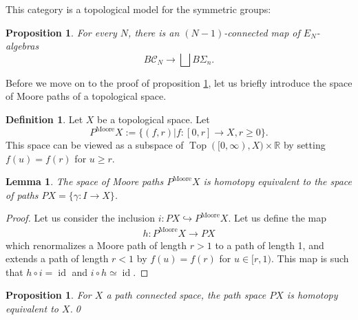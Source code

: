 \documentclass[12pt]{amsart}
\theoremstyle{plain}
\newtheorem{prop}[teo]{Proposition}
\newtheorem{lem}[teo]{Lemma}
\theoremstyle{definition}
\newtheorem{defi}[teo]{Definition}
\theoremstyle{remark}
\DeclareMathOperator{\id}{id}
\DeclareMathOperator{\Top}{Top}
\DeclareMathOperator{\Moore}{Moore}
\newcommand{\C}{\mathcal{C}}
\begin{document}
This category is a topological model for the symmetric groups: 
\begin{prop}\label{homeq}
    For every $N$, there is an $(N-1)$-connected map of $E_N$-algebras
    \[B\C_N\rightarrow\bigsqcup B\Sigma_n.\]
\end{prop}

Before we move on to the proof of proposition \ref{homeq}, let us briefly introduce the space of Moore paths of a topological space.
\begin{defi}
Let $X$ be a topological space. Let \[P^{\Moore}X := \{(f,r)\vert f:[0,r]\rightarrow X, r\geq 0\}.\] 
This space can be viewed as a subspace of $\Top([0,\infty),X)\times\mathbb{R}$ by setting $f(u) = f(r)$ for $u\geq r$.
\end{defi}
\begin{lem}\label{Moorepathseq}
The space of Moore paths $P^{\Moore}X$ is homotopy equivalent to the space of paths $PX = \{\gamma:I\rightarrow X\}$.
\end{lem}
\begin{proof}
Let us consider the inclusion $i:PX \hookrightarrow P^{\Moore}X$.
Let us define the map \begin{align*}
h:P^{\Moore}X \rightarrow PX\end{align*} which renormalizes a Moore path of length $r>1$ to a path of length 1, and extends a path of length $r<1$ by $f(u)=f(r)$ for $u\in[r,1)$.
This map is such that $h\circ i = \id$ and $i\circ h \simeq \id$.
\end{proof}
\begin{prop}
For $X$ a path connected space, the path space $PX$ is homotopy equivalent to $X$.\qed
\end{prop}
\end{document}
